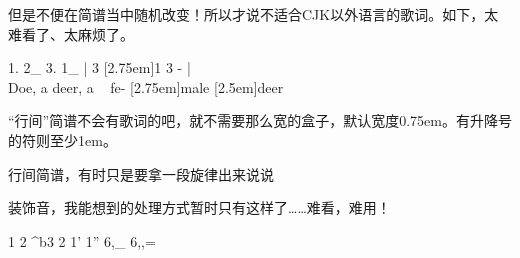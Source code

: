 \documentclass[fontset=ubuntu]{ctexart}
\begin{document}
但是不便在简谱当中随机改变！所以才说不适合CJK以外语言的歌词。如下，太难看了、太麻烦了。

\begin{tcblisting}{}
\setjpnotewidth{1.5em}
\begin{jianpu}
{1.} {2_} {3.} {1_} | 3 {[2.75em]1} 3 - | \\
\small {Doe,} \enspace a {deer,} \enspace a ~ {fe-} {[2.75em]male} {[2.5em]deer}
\end{jianpu}
\end{tcblisting}

“行间”简谱不会有歌词的吧，就不需要那么宽的盒子，默认宽度0.75em。有升降号的符则至少1em。

\begin{tcblisting}{}
行间简谱，有时只是要拿一段旋律出来说说
\end{tcblisting}

装饰音，我能想到的处理方式暂时只有这样了……难看，难用！

\begin{tcblisting}{}
\begin{jianpu}
1 2 {\slurB[0.2ex][0.25em]} {^b3} 2  {\slurB[2pt]} {1'} {1''} {\slurE[5pt]} {6,_} {6,,=}
\end{jianpu}
\end{tcblisting}
\end{document}
